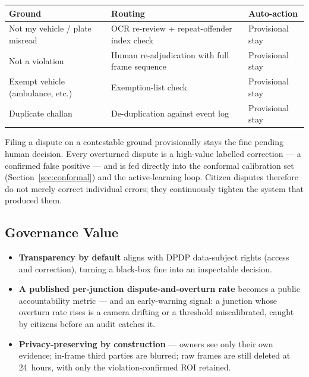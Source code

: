 \documentclass[11pt,a4paper]{article}
\begin{document}
\begin{center}
\begin{tabular}{L{4.6cm} L{6.4cm} L{3.0cm}}
    \toprule
    \color{white}\textbf{Ground} & \color{white}\textbf{Routing} & \color{white}\textbf{Auto-action} \\
    \midrule
    Not my vehicle / plate misread & OCR re-review + repeat-offender index check & Provisional stay \\
    Not a violation & Human re-adjudication with full frame sequence & Provisional stay \\
    Exempt vehicle (ambulance, etc.) & Exemption-list check & Provisional stay \\
    Duplicate challan & De-duplication against event log & Provisional stay \\
    \bottomrule
\end{tabular}
\end{center}

\noindent Filing a dispute on a contestable ground provisionally stays the fine pending human decision. Every overturned dispute is a high-value labelled correction --- a confirmed false positive --- and is fed directly into the conformal calibration set (Section~\ref{sec:conformal}) and the active-learning loop. Citizen disputes therefore do not merely correct individual errors; they continuously tighten the system that produced them.

\subsection*{Governance Value}

\begin{itemize}[leftmargin=1.8em, itemsep=0.2em]
    \item \textbf{Transparency by default} aligns with DPDP data-subject rights (access and correction), turning a black-box fine into an inspectable decision.
    \item \textbf{A published per-junction dispute-and-overturn rate} becomes a public accountability metric --- and an early-warning signal: a junction whose overturn rate rises is a camera drifting or a threshold miscalibrated, caught by citizens before an audit catches it.
    \item \textbf{Privacy-preserving by construction} --- owners see only their own evidence; in-frame third parties are blurred; raw frames are still deleted at 24~hours, with only the violation-confirmed ROI retained.
\end{itemize}
\end{document}
